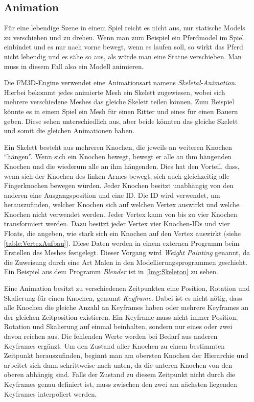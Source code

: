 \subsection{Animation}

Für eine lebendige Szene in einem Spiel reicht es nicht aus, nur statische Models zu verschieben und zu drehen. Wenn man zum Beispiel ein Pferdmodel im Spiel einbindet und es nur nach vorne bewegt, wenn es laufen soll, so wirkt das Pferd nicht lebendig und es sähe so aus, als würde man eine Statue verschieben. Man muss in diesem Fall also ein Modell animieren.

Die FM3D-Engine verwendet eine Animationsart namens \textit{Skeletal-Animation}. Hierbei bekommt jedes animierte Mesh ein Skelett zugewiesen, wobei sich mehrere verschiedene Meshes das gleiche Skelett teilen können. Zum Beispiel könnte es in einem Spiel ein Mesh für einen Ritter und eines für einen Bauern geben. Diese sehen unterschiedlich aus, aber beide könnten das gleiche Skelett und somit die gleichen Animationen haben.

Ein Skelett besteht aus mehreren Knochen, die jeweils an weiteren Knochen "`hängen"'. Wenn sich ein Knochen bewegt, bewegt er alle an ihm hängenden Knochen und die wiederum alle an ihm hängenden. 
Dies hat den Vorteil, dass, wenn sich der Knochen des linken Armes bewegt, sich auch gleichzeitig alle Fingerknochen bewegen würden. Jeder Knochen besitzt unabhängig von den anderen eine Ausgangsposition und eine ID.
Die ID wird verwendet, um herauszufinden, welcher Knochen sich auf welchen Vertex auswirkt und welche Knochen nicht verwendet werden. Jeder Vertex kann von bis zu vier Knochen transformiert werden. Dazu besitzt jeder Vertex vier Knochen-IDs und vier Floats, die angeben, wie stark sich ein Knochen auf den Vertex auswirkt (siehe \cref{table:VertexAufbau}). Diese Daten werden in einem externen Programm beim Erstellen des Meshes festgelegt. Dieser Vorgang wird \textit{Weight Painting} genannt, da die Zuweisung durch eine Art Malen in den Modellierungsprogrammen geschieht. Ein Beispiel aus dem Programm \textit{Blender} ist in \cref{Img:Skeleton} zu sehen.

Eine Animation besitzt zu verschiedenen Zeitpunkten eine Position, Rotation und Skalierung für einen Knochen, genannt \textit{Keyframe}. Dabei ist es nicht nötig, dass alle Knochen die gleiche Anzahl an Keyframes haben oder mehrere Keyframes an der gleichen Zeitposition existieren. Ein Keyframe muss nicht immer Position, Rotation und Skalierung auf einmal beinhalten, sondern nur eines oder zwei davon reichen aus. Die fehlenden Werte werden bei Bedarf aus anderen Keyframes ergänzt. Um den Zustand aller Knochen zu einem bestimmten Zeitpunkt herauszufinden, beginnt man am obersten Knochen der Hierarchie und arbeitet sich dann schrittweise nach unten, da die unteren Knochen von den oberen abhängig sind. 
Falls der Zustand zu diesem Zeitpunkt nicht durch die Keyframes genau definiert ist, muss zwischen den zwei am nächsten liegenden Keyframes interpoliert werden.

